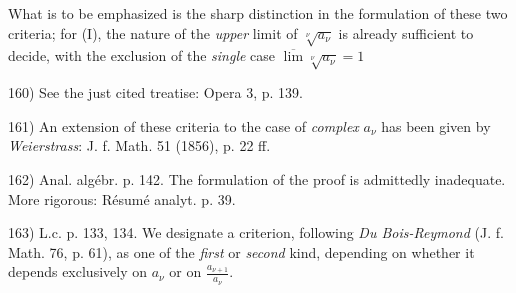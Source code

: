 What is to be emphasized is the sharp distinction in the formulation of these two criteria; for (I), the nature of the \textit{upper} limit of $\sqrt[\nu]{a_\nu}$ is already sufficient to decide, with the exclusion of the \textit{single} case $\overline{\lim} \sqrt[\nu]{a_\nu} = 1$

\vspace{-0.1cm}
\leftline{\rule{2in}{0.4pt}}
\vspace{0.1cm}
{
\footnotesize
160) See the just cited treatise: Opera 3, p. 139.

161) An extension of these criteria to the case of \textit{complex} $a_\nu$ has been given by \textit{Weierstrass}: J. f. Math. 51 (1856), p. 22 ff.

162) Anal. algébr. p. 142. The formulation of the proof is admittedly inadequate. More rigorous: Résumé analyt. p. 39.

163) L.c. p. 133, 134. We designate a criterion, following \textit{Du Bois-Reymond} (J. f. Math. 76, p. 61), as one of the \textit{first} or \textit{second} kind, depending on whether it depends exclusively on $a_\nu$ or on $\frac{a_{\nu+1}}{a_\nu}$.

}